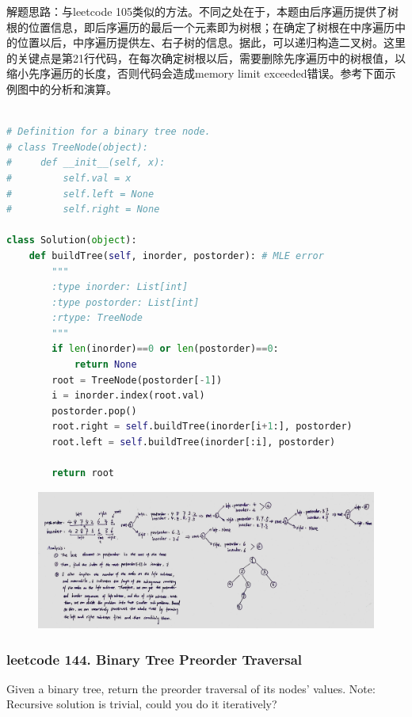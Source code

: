 \documentclass[a4paper,10pt]{article}
\begin{document}
\begin{CJK*}{UTF8}{gbsn}
\noindent 解题思路：与leetcode 105类似的方法。不同之处在于，本题由后序遍历提供了树根的位置信息，即后序遍历的最后一个元素即为树根；在确定了树根在中序遍历中的位置以后，中序遍历提供左、右子树的信息。据此，可以递归构造二叉树。这里的关键点是第21行代码，在每次确定树根以后，需要删除先序遍历中的树根值，以缩小先序遍历的长度，否则代码会造成memory limit exceeded错误。参考下面示例图中的分析和演算。\\
\end{CJK*}

\begin{lstlisting}[language=Python, caption=Problem106. Construct Binary Tree from Inorder and Postorder Traversal]

# Definition for a binary tree node.
# class TreeNode(object):
#     def __init__(self, x):
#         self.val = x
#         self.left = None
#         self.right = None

class Solution(object):
    def buildTree(self, inorder, postorder): # MLE error
        """
        :type inorder: List[int]
        :type postorder: List[int]
        :rtype: TreeNode
        """
        if len(inorder)==0 or len(postorder)==0:
            return None
        root = TreeNode(postorder[-1])
        i = inorder.index(root.val)
        postorder.pop()
        root.right = self.buildTree(inorder[i+1:], postorder)
        root.left = self.buildTree(inorder[:i], postorder)
        
        return root
\end{lstlisting}

\begin{figure}[h]
    \includegraphics[width=\textwidth]{leetcode106.jpg}
    \centering \\
\end{figure}


\subsubsection{leetcode 144. Binary Tree Preorder Traversal}
Given a binary tree, return the preorder traversal of its nodes' values. Note: Recursive solution is trivial, could you do it iteratively? \\
\end{document}
